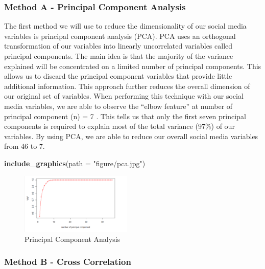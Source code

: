 \documentclass[12pt,oneside]{chicagocapstone}
\newenvironment{Shaded}{\begin{snugshade}}{\end{snugshade}}
\newcommand{\DataTypeTok}[1]{\textcolor[rgb]{0.13,0.29,0.53}{#1}}
\newcommand{\KeywordTok}[1]{\textcolor[rgb]{0.13,0.29,0.53}{\textbf{#1}}}
\newcommand{\NormalTok}[1]{#1}
\newcommand{\StringTok}[1]{\textcolor[rgb]{0.31,0.60,0.02}{#1}}
\begin{document}
\hypertarget{method-a---principal-component-analysis}{%
\subsubsection*{Method A - Principal Component Analysis}\label{method-a---principal-component-analysis}}

The first method we will use to reduce the dimensionality of our social media variables is principal component analysis (PCA). PCA uses an orthogonal transformation of our variables into linearly uncorrelated variables called principal components. The main idea is that the majority of the variance explained will be concentrated on a limited number of principal components. This allows us to discard the principal component variables that provide little additional information. This approach further reduces the overall dimension of our original set of variables. When performing this technique with our social media variables, we are able to observe the ``elbow feature'' at number of principal component (n) = 7 . This tells us that only the first seven principal components is required to explain most of the total variance (97\%) of our variables. By using PCA, we are able to reduce our overall social media variables from 46 to 7.
\begin{Shaded}
\begin{Highlighting}[]
\KeywordTok{include_graphics}\NormalTok{(}\DataTypeTok{path =} \StringTok{"figure/pca.jpg"}\NormalTok{)}
\end{Highlighting}
\end{Shaded}
\begin{figure}

{\centering \includegraphics[width=200px]{figure/pca} 

}

\caption{Principal Component Analysis}\label{fig:pca}
\end{figure}
\hypertarget{method-b---cross-correlation}{%
\subsubsection*{Method B - Cross Correlation}\label{method-b---cross-correlation}}
\end{document}
